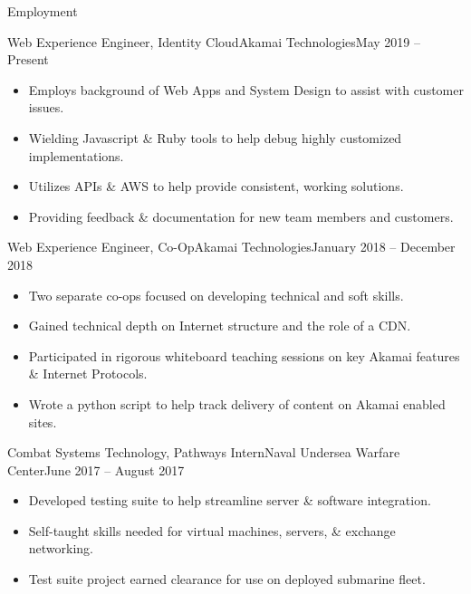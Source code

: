 \documentclass[]{mcdowellcv}
\begin{document}
	\makeheader
	
	\begin{cvsection}{Employment}
		\begin{cvsubsection}{Web Experience Engineer, Identity Cloud}{Akamai Technologies}{May 2019 -- Present}
		\vspace{2mm}
			\begin{itemize}
				\item Employs background of Web Apps and System Design to assist with customer issues.
				\item Wielding Javascript \& Ruby tools to help debug highly customized implementations.
				\item Utilizes APIs \& AWS to help provide consistent, working solutions.
				\item Providing feedback \& documentation for new team members and customers.
			\end{itemize}
		\end{cvsubsection}
		
		\begin{cvsubsection}{Web Experience Engineer, Co-Op}{Akamai Technologies}{January 2018 -- December 2018}
		\vspace{2mm}
			\begin{itemize}
				\item Two separate co-ops focused on developing technical and soft skills.
				\item Gained technical depth on Internet structure and the role of a CDN.
				\item Participated in rigorous whiteboard teaching sessions on key Akamai features \& Internet Protocols.
				\item Wrote a python script to help track delivery of content on Akamai enabled sites.
			\end{itemize}
		\end{cvsubsection}
		
		\begin{cvsubsection}{Combat Systems Technology, Pathways Intern}{Naval Undersea Warfare Center}{June 2017 -- August 2017}
		\vspace{2mm}
			\begin{itemize}
				\item Developed testing suite to help streamline server \& software integration.
				\item Self-taught skills needed for virtual machines, servers, \& exchange networking.
				\item Test suite project earned clearance for use on deployed submarine fleet.
			\end{itemize}
		\end{cvsubsection}
		
	\end{cvsection}
	
\end{document}
